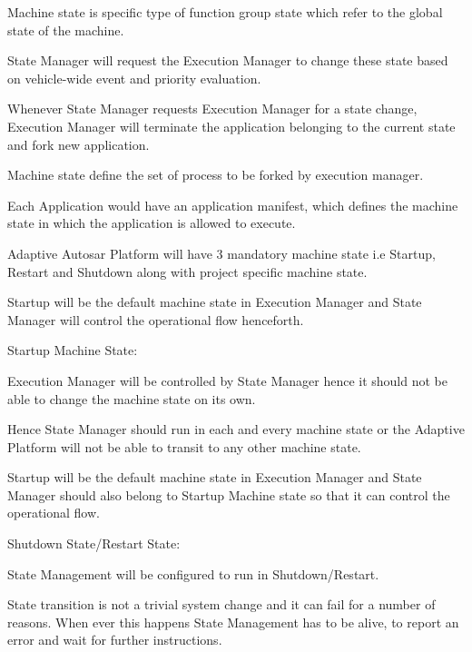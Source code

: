 \begin{DoxyItemize}
\item Machine state is specific type of function group state which refer to the global state of the machine.
\item State Manager will request the Execution Manager to change these state based on vehicle-\/wide event and priority evaluation.
\item Whenever State Manager requests Execution Manager for a state change, Execution Manager will terminate the application belonging to the current state and fork new application.
\item Machine state define the set of process to be forked by execution manager.
\item Each Application would have an application manifest, which defines the machine state in which the application is allowed to execute.
\item Adaptive Autosar Platform will have 3 mandatory machine state i.\+e Startup, Restart and Shutdown along with project specific machine state.
\item Startup will be the default machine state in Execution Manager and State Manager will control the operational flow henceforth.
\item Startup Machine State\+:
\begin{DoxyItemize}
\item Execution Manager will be controlled by State Manager hence it should not be able to change the machine state on its own.
\item Hence State Manager should run in each and every machine state or the Adaptive Platform will not be able to transit to any other machine state.
\item Startup will be the default machine state in Execution Manager and State Manager should also belong to Startup Machine state so that it can control the operational flow.
\end{DoxyItemize}
\item Shutdown State/\+Restart State\+:
\begin{DoxyItemize}
\item State Management will be configured to run in Shutdown/\+Restart.
\item State transition is not a trivial system change and it can fail for a number of reasons. When ever this happens State Management has to be alive, to report an error and wait for further instructions.
\end{DoxyItemize}
\end{DoxyItemize}

